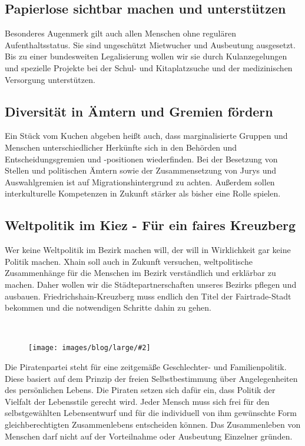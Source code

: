 \documentclass[a4paper,10pt]{article}
\newcommand{\mysection}[1]{{\vspace{1cm}\noindent\color{gray}{\ttfamily\LARGE\raggedright #1}\\\medskip}}
\newcommand{\abschnitt}[2]{%
\mysection{\raggedright #1}%
\begin{figure}[t]%
\vspace*{-2.7cm}%
\hspace*{-2.1cm}%
\texttt{[image: images/blog/large/\#2]} %
\end{figure}%
}
\newcommand{\bottomfigure}[1]{
\parbox{5cm}{
\vspace*{1cm}%
\texttt{[image: ./images/blog/large/\#1]}
}
}
\begin{document}
\subsection*{\ttfamily Papierlose sichtbar machen und
unterstützen}\label{papierlose-sichtbar-machen-und-unterstuxfctzen}

Besonderes Augenmerk gilt auch allen Menschen ohne regulären
Aufenthaltsstatus. Sie sind ungeschützt Mietwucher und Ausbeutung
ausgesetzt. Bis zu einer bundesweiten Legalisierung wollen wir sie durch
Kulanzegelungen und spezielle Projekte bei der Schul- und Kitaplatzsuche
und der medizinischen Versorgung unterstützen.

\subsection*{\ttfamily Diversität in Ämtern und Gremien
fördern}\label{diversituxe4t-in-uxe4mtern-und-gremien-fuxf6rdern}

Ein Stück vom Kuchen abgeben heißt auch, dass marginalisierte Gruppen
und Menschen unterschiedlicher Herkünfte sich in den Behörden und
Entscheidungsgremien und -positionen wiederfinden. Bei der Besetzung von
Stellen und politischen Ämtern sowie der Zusammensetzung von Jurys und
Auswahlgremien ist auf Migrationshintergrund zu achten. Außerdem sollen
interkulturelle Kompetenzen in Zukunft stärker als bisher eine Rolle
spielen.

\subsection*{\ttfamily Weltpolitik im Kiez - Für ein faires
Kreuzberg}\label{weltpolitik-im-kiez---fuxfcr-ein-faires-kreuzberg}

Wer keine Weltpolitik im Bezirk machen will, der will in Wirklichkeit
gar keine Politik machen. Xhain soll auch in Zukunft versuchen,
weltpolitische Zusammenhänge für die Menschen im Bezirk verständlich und
erklärbar zu machen. Daher wollen wir die Städtepartnerschaften unseres
Bezirks pflegen und ausbauen. Friedrichshain-Kreuzberg muss endlich den
Titel der Fairtrade-Stadt bekommen und die notwendigen Schritte dahin zu
gehen.


\clearpage
\abschnitt{\raggedright Geschlechter- {\raisebox{-.5cm}{~}} und 
\mbox{Familienpolitik}}{MutterMutterKind.png}

Die Piratenpartei steht für eine zeitgemäße Geschlechter- und
Familienpolitik. Diese basiert auf dem Prinzip der freien
Selbstbestimmung über Angelegenheiten des persönlichen Lebens. Die
Piraten setzen sich dafür ein, dass Politik der Vielfalt der Lebensstile
gerecht wird. Jeder Mensch muss sich frei für den selbstgewählten
Lebensentwurf und für die individuell von ihm gewünschte Form
gleichberechtigten Zusammenlebens entscheiden können. Das Zusammenleben
von Menschen darf nicht auf der Vorteilnahme oder Ausbeutung Einzelner
gründen.
\end{document}
